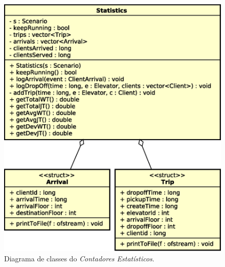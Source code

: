 \begin{figure}[htb!]
  \centering
  \includegraphics[scale=0.6]{img/Statistics}
  \caption{Diagrama de classes do \textit{Contadores Estatísticos}.}
\label{fig:diagram:statistics}
\end{figure}

